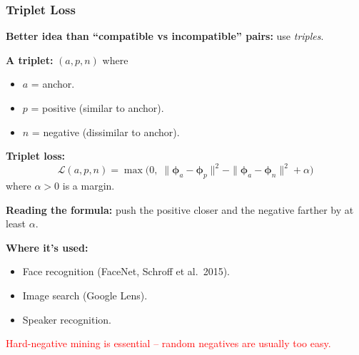 \documentclass[notes,11pt, aspectratio=169]{beamer}
\newcommand{\vphi}{\boldsymbol{\phi}}
\begin{document}
\begin{frame}
\frametitle{Triplet Loss}

\textbf{Better idea than ``compatible vs incompatible'' pairs:} use \emph{triples}.

\vspace{6pt}
\textbf{A triplet:} $(a, p, n)$ where
\begin{itemize}
    \item $a$ = anchor.
    \item $p$ = positive (similar to anchor).
    \item $n$ = negative (dissimilar to anchor).
\end{itemize}

\vspace{8pt}
\textbf{Triplet loss:}
\[
    \mathcal{L}(a, p, n) = \max\bigl(0, \;\|\vphi_a - \vphi_p\|^2 - \|\vphi_a - \vphi_n\|^2 + \alpha\bigr)
\]
where $\alpha > 0$ is a margin.

\vspace{6pt}
\textbf{Reading the formula:} push the positive closer and the negative farther by at least $\alpha$.

\vspace{8pt}
\textbf{Where it's used:}
\begin{itemize}
    \item Face recognition (FaceNet, Schroff et al.\ 2015).
    \item Image search (Google Lens).
    \item Speaker recognition.
\end{itemize}

\textcolor{red}{Hard-negative mining is essential -- random negatives are usually too easy.}
\end{frame}
\end{document}
